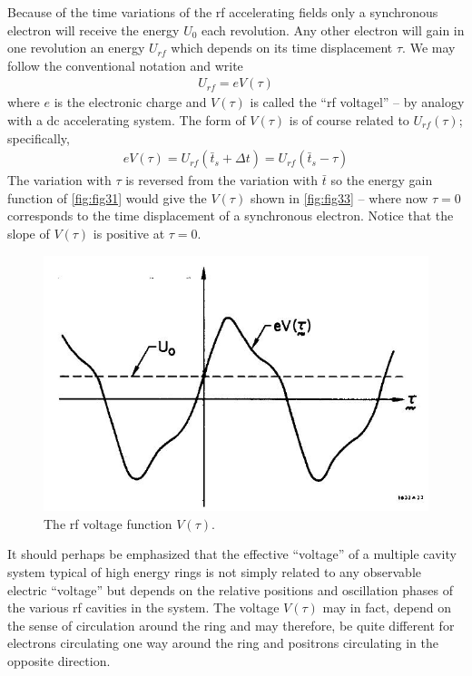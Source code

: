 Because of the time variations of the rf accelerating fields only a synchronous electron will receive the energy $U_0$ each revolution. Any other electron will gain in one revolution an energy $U_{rf}$ which depends on its time displacement $\tau$. We may follow the conventional notation and write
\begin{align}
	U_{rf} = eV(\tau)
\end{align}
where $e$ is the electronic charge and $V(\tau)$ is called the ``rf voltagel'' -- by analogy with a dc accelerating system. The form of $V(\tau)$ is of course related to $U_{rf}(\tau)$; specifically,
\begin{align}
	eV(\tau) = U_{rf}(\bar{t}_s + \Delta t) = U_{rf}(\bar{t}_s - \tau)
\end{align}
The variation with $\tau$ is reversed from the variation with $\bar{t}$ so the energy gain function of \autoref{fig:fig31} would give the $V(\tau)$ shown in \autoref{fig:fig33} -- where now $\tau = 0$ corresponds to the time displacement of a synchronous electron. Notice that the slope of $V(\tau)$ is positive at $\tau = 0$.

\begin{figure}[!htb]
	\centering
	\includegraphics[width=0.6\linewidth]{./Figuras/fig33.jpeg}
	\caption{The rf voltage function $V(\tau)$.}
	\label{fig:fig33}
\end{figure}

It should perhaps be emphasized that the effective ``voltage'' of a multiple cavity system typical of high energy rings is not simply related to any observable electric ``voltage'' but depends on the relative positions and oscillation phases of the various rf cavities in the system. The voltage $V(\tau)$ may in fact, depend on the sense of circulation around the ring and may therefore, be quite different for electrons circulating one way around the ring and positrons circulating in the opposite direction.

